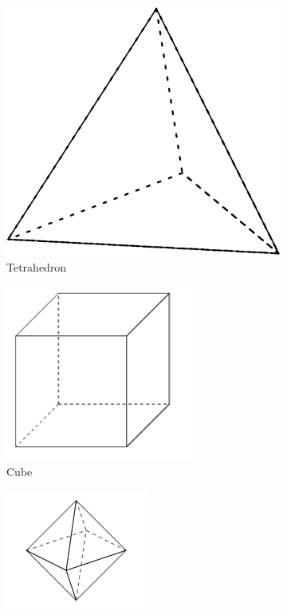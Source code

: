         \begin{figure} [hbt!]
            \centering
            \begin{subfigure}[b]{.45\linewidth}
                \includegraphics[scale=0.25]{Resources/Unit6Solids/tetrahedron.png}
                \caption*{Tetrahedron}
            \end{subfigure}
            \begin{subfigure}[b]{.45\linewidth}
                \includegraphics[scale=0.5]{Resources/Unit6Solids/cube.PNG}
                \caption*{Cube}
            \end{subfigure}
            \begin{subfigure}[b]{.45\linewidth}
                \includegraphics[scale=1]{Resources/Unit6Solids/octahedron.PNG}

\end{subfigure}
\end{figure}
